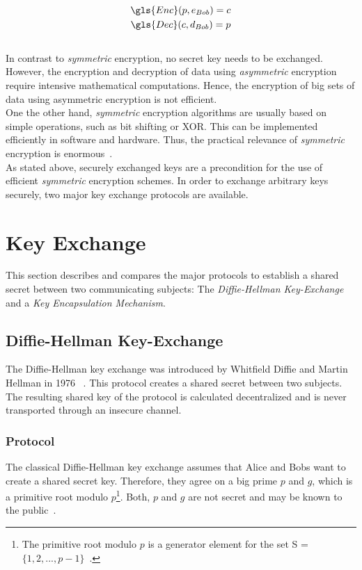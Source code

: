 \begin{align*}
\gls{Enc}(p, e_{Bob}) = c\\
\gls{Dec}(c, d_{Bob}) = p
\end{align*}
\\
In contrast to \textit{symmetric} encryption, no secret key needs to be exchanged. However, the encryption and decryption of data using \textit{asymmetric} encryption require intensive mathematical computations. Hence, the encryption of big sets of data using asymmetric encryption is not efficient.\\
One the other hand, \textit{symmetric} encryption algorithms are usually based on simple operations, such as bit shifting or XOR. This can be implemented efficiently in software and hardware. Thus, the practical relevance of \textit{symmetric} encryption is enormous~\parencite{ITSicherheit}.
\\
As stated above, securely exchanged keys are a precondition for the use of efficient \textit{symmetric} encryption schemes. In order to exchange arbitrary keys securely, two major key exchange protocols are available.

\section{Key Exchange}
This section describes and compares the major protocols to establish a shared secret between two communicating subjects: The \textit{Diffie-Hellman Key-Exchange} and a \textit{Key Encapsulation Mechanism}.

\subsection{Diffie-Hellman Key-Exchange}

The Diffie-Hellman key exchange was introduced by Whitfield Diffie and Martin Hellman in 1976 ~\parencite{diffie1976new}. This protocol creates a shared secret between two subjects. The resulting shared key of the protocol is calculated decentralized and is never transported through an insecure channel.

\subsubsection{Protocol}

The classical Diffie-Hellman key exchange assumes that Alice and Bobs want to create a shared secret key. Therefore, they agree on a big prime $p$ and $g$, which is a primitive root modulo $p$\footnote{The primitive root modulo $p$ is a generator element for the set S = $\{1, 2, ... , p-1\}$~\parencite{ITSicherheit}.}. Both, $p$ and $g$ are not secret and may be known to the public~\parencite{watjen2018kryptographie}.

